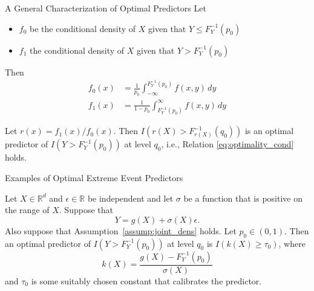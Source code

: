 \documentclass{beamer}
\def\R{\mathbb R}
\begin{document}
\begin{frame}{A General Characterization of Optimal Predictors}
    Let
    \begin{itemize}
        \item $f_0$ be the conditional density of $X$ given that $Y \le F_Y^{-1}(p_0)$
        \item $f_1$ the conditional density of $X$ given that $Y > F_Y^{-1}(p_0)$
    \end{itemize}
    Then
    \begin{align*}
        f_0(x) &= \frac{1}{p_0}\int_{-\infty}^{F_Y^{-1}(p_0)} f(x, y)\,dy \\
        f_1(x) &= \frac{1}{1 - p_0}\int_{F_Y^{-1}(p_0)}^{\infty} f(x, y)\,dy
    \end{align*}

    \begin{theorem}\label{thm:base_thm}
        Let $r(x) = f_1(x) / f_0(x)$. Then $I(r(X) > F_{r(X)}^{-1}(q_0))$ is an optimal predictor of $I(Y > F_Y^{-1}(p_0))$ at level $q_0$, i.e., Relation \eqref{eq:optimality_cond} holds.
    \end{theorem}
\end{frame}

\begin{frame}{Examples of Optimal Extreme Event Predictors}
    \begin{theorem}\label{thm:add_err_mod_thm}
        Let $X \in \R^d$ and $\epsilon \in \R$ be independent and let $\sigma$ be a function that is positive on the range of $X$. Suppose that 
        \begin{equation}\label{e:thm:add_err_mod_thm}
        Y = g(X) + \sigma(X)\epsilon.
        \end{equation}
        Also suppose that Assumption~\ref{assump:joint_dens} holds. Let $p_0 \in (0, 1)$. Then an optimal predictor of $I(Y > F_Y^{-1}(p_0))$ at level $q_0$ is $I(k(X) \ge \tau_0)$, where
        \[
        k(X) = \frac{g(X) - F_Y^{-1}(p_0)}{\sigma(X)}
        \]
        and $\tau_0$ is some suitably chosen constant that calibrates the predictor.
    \end{theorem}
\end{frame}
\end{document}
